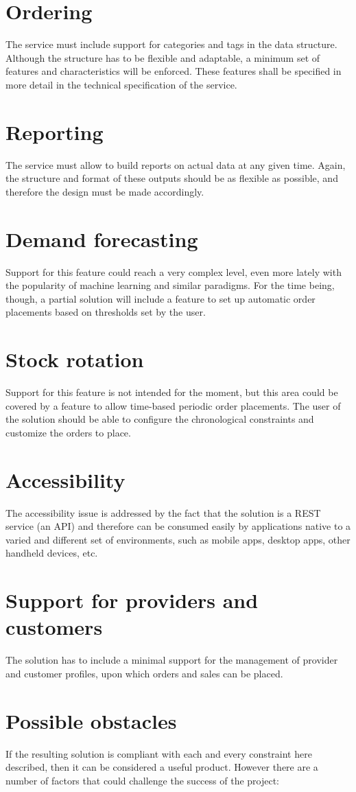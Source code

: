 \section{Ordering}
The service must include support for categories and tags in the data structure. Although the structure has to be flexible and adaptable, a minimum set of features and characteristics will be enforced. These features shall be specified in more detail in the technical specification of the service.
\section{Reporting}
The service must allow to build reports on actual data at any given time. Again, the structure and format of these outputs should be as flexible as possible, and therefore the design must be made accordingly.
\section{Demand forecasting}
Support for this feature could reach a very complex level, even more lately with the popularity of machine learning and similar paradigms. For the time being, though, a partial solution will include a feature to set up automatic order placements based on thresholds set by the user.
\section{Stock rotation}
Support for this feature is not intended for the moment, but this area could be covered by a feature to allow time-based periodic order placements. The user of the solution should be able to configure the chronological constraints and customize the orders to place.
\section{Accessibility}
The accessibility issue is addressed by the fact that the solution is a REST service (an API) and therefore can be consumed easily by applications native to a varied and different set of environments, such as mobile apps, desktop apps, other handheld devices, etc.
\section{Support for providers and customers}
The solution has to include a minimal support for the management of provider and customer profiles, upon which orders and sales can be placed.
\section{Possible obstacles}
If the resulting solution is compliant with each and every constraint here described, then it can be considered a useful product. However there are a number of factors that could challenge the success of the project:

